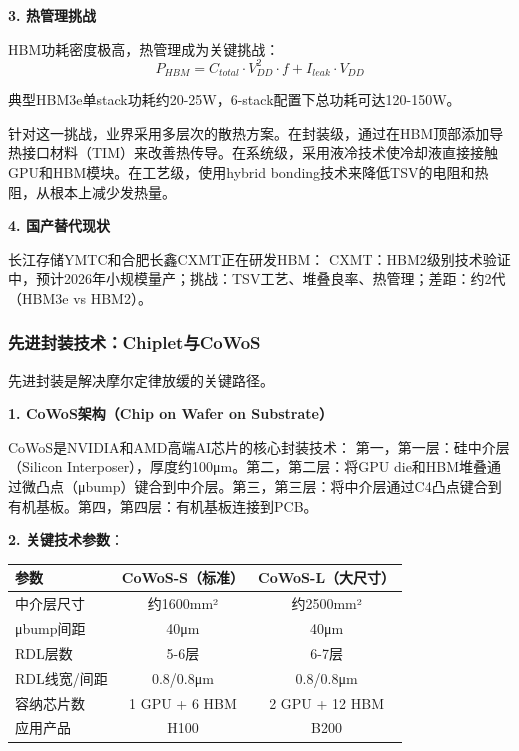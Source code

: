 \textbf{3. 热管理挑战}

HBM功耗密度极高，热管理成为关键挑战：
\begin{equation}
P_{HBM} = C_{total} \cdot V_{DD}^2 \cdot f + I_{leak} \cdot V_{DD}
\end{equation}

典型HBM3e单stack功耗约20-25W，6-stack配置下总功耗可达120-150W。

针对这一挑战，业界采用多层次的散热方案。在封装级，通过在HBM顶部添加导热接口材料（TIM）来改善热传导。在系统级，采用液冷技术使冷却液直接接触GPU和HBM模块。在工艺级，使用hybrid bonding技术来降低TSV的电阻和热阻，从根本上减少发热量。

\textbf{4. 国产替代现状}

长江存储YMTC和合肥长鑫CXMT正在研发HBM：
CXMT：HBM2级别技术验证中，预计2026年小规模量产；挑战：TSV工艺、堆叠良率、热管理；差距：约2代（HBM3e vs HBM2）。

\subsubsection{先进封装技术：Chiplet与CoWoS}

先进封装是解决摩尔定律放缓的关键路径\cite{TSMC2024CoWoS, Intel2024EMIB, AMD2024Chiplet}。

\textbf{1. CoWoS架构（Chip on Wafer on Substrate）}

CoWoS是NVIDIA和AMD高端AI芯片的核心封装技术：
第一，第一层：硅中介层（Silicon Interposer），厚度约100μm。第二，第二层：将GPU die和HBM堆叠通过微凸点（μbump）键合到中介层。第三，第三层：将中介层通过C4凸点键合到有机基板。第四，第四层：有机基板连接到PCB。

\textbf{2. 关键技术参数}：

\begin{table}[H]
\centering
\small
\begin{tabular}{lcc}
\toprule
\textbf{参数} & \textbf{CoWoS-S（标准）} & \textbf{CoWoS-L（大尺寸）} \\
\midrule
中介层尺寸 & 约1600mm² & 约2500mm² \\
μbump间距 & 40μm & 40μm \\
RDL层数 & 5-6层 & 6-7层 \\
RDL线宽/间距 & 0.8/0.8μm & 0.8/0.8μm \\
容纳芯片数 & 1 GPU + 6 HBM & 2 GPU + 12 HBM \\
应用产品 & H100 & B200 \\
\bottomrule
\end{tabular}
\end{table}

